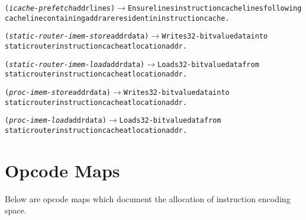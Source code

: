 \begin{alltt}
({\em{icache-prefetch}} addr lines)  \(\longrightarrow\)  \textrm{Ensure} lines \textrm{instruction cache lines following}
                                   \textrm{cache line containing} addr \textrm{are resident in instruction cache.}

({\em{static-router-imem-store}} addr data)  \(\longrightarrow\)  \textrm{Writes 32-bit value} data \textrm{into}
                       \hspace{.25mm}                    \textrm{static router instruction cache at location} addr.

({\em{static-router-imem-load}} addr data)   \(\longrightarrow\)  \textrm{Loads 32-bit value} data \textrm{from}
                       \hspace{.25mm}                    \textrm{static router instruction cache at location} addr.

({\em{proc-imem-store}} addr data)           \(\longrightarrow\)  \textrm{Writes 32-bit value} data \textrm{into}
                       \hspace{.25mm}                    \textrm{static router instruction cache at location} addr.

({\em{proc-imem-load}} addr data)            \(\longrightarrow\)  \textrm{Loads 32-bit value} data \textrm{from}
                       \hspace{.25mm}                    \textrm{static router instruction cache at location} addr.
\end{alltt}

\newpage
\section{Opcode Maps}
\label{sec:opcode-maps}

Below are opcode maps which document the allocation of instruction
encoding space.
\vspace{5mm}

